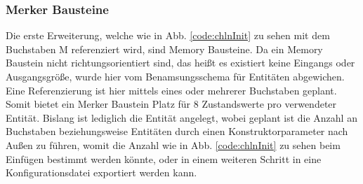 \subsubsection{Merker Bausteine}\label{kap:ums:memorychannel}
Die erste Erweiterung, welche wie in Abb. \ref{code:chlnInit} zu sehen mit dem Buchstaben M referenziert wird, sind Memory Bausteine. Da ein Memory Baustein nicht richtungsorientiert sind, das heißt es existiert keine Eingangs oder Ausgangsgröße, wurde hier vom Benamsungsschema für Entitäten  abgewichen. Eine Referenzierung ist hier mittels eines oder mehrerer Buchstaben geplant. Somit bietet ein Merker Baustein Platz für 8 Zustandswerte pro verwendeter Entität. Bislang ist lediglich die Entität  angelegt, wobei geplant ist die Anzahl an Buchstaben beziehungsweise Entitäten durch einen Konstruktorparameter nach Außen zu führen, womit die Anzahl wie in Abb. \ref{code:chlnInit} zu sehen beim Einfügen bestimmt werden könnte, oder in einem weiteren Schritt in eine Konfigurationsdatei exportiert werden kann. 

